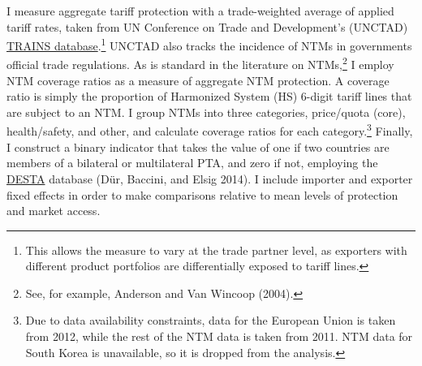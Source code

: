 \documentclass{puthesis}
\begin{document}
I measure aggregate tariff protection with a trade-weighted average of
applied tariff rates, taken from UN Conference on Trade and
Development's (UNCTAD)
\href{https://databank.worldbank.org/data/reports.aspx?source=UNCTAD-~-Trade-Analysis-Information-System-\%28TRAINS\%29\#}{TRAINS
database}.\footnote{This allows the measure to vary at the trade partner
  level, as exporters with different product portfolios are
  differentially exposed to tariff lines.} UNCTAD also tracks the
incidence of NTMs in governments official trade regulations. As is
standard in the literature on NTMs,\footnote{See, for example, Anderson
  and Van Wincoop (2004).} I employ NTM coverage ratios as a measure of
aggregate NTM protection. A coverage ratio is simply the proportion of
Harmonized System (HS) 6-digit tariff lines that are subject to an NTM.
I group NTMs into three categories, price/quota (core), health/safety,
and other, and calculate coverage ratios for each category.\footnote{Due
  to data availability constraints, data for the European Union is taken
  from 2012, while the rest of the NTM data is taken from 2011. NTM data
  for South Korea is unavailable, so it is dropped from the analysis.}
Finally, I construct a binary indicator that takes the value of one if
two countries are members of a bilateral or multilateral PTA, and zero
if not, employing the
\href{https://www.designoftradeagreements.org/downloads/}{DESTA}
database (Dür, Baccini, and Elsig 2014). I include importer and exporter
fixed effects in order to make comparisons relative to mean levels of
protection and market access.
\end{document}
